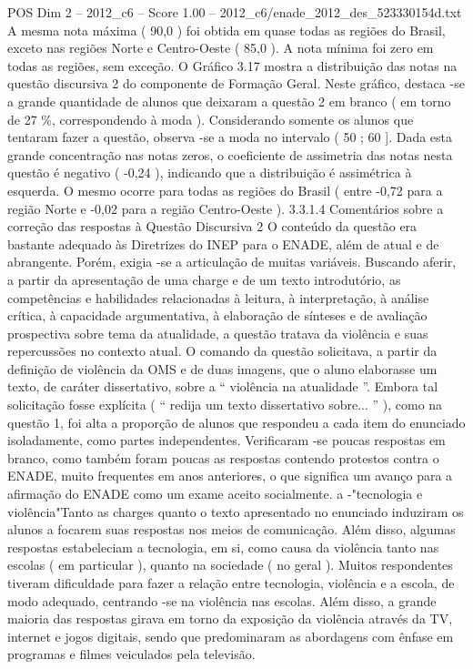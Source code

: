 \begin{textsample}{POS Dim 2 – 2012\_c6 – Score 1.00 – 2012\_c6/enade\_2012\_des\_523330154d.txt}
A mesma nota máxima ( 90,0 ) foi obtida em quase todas as regiões do Brasil, exceto nas regiões Norte e Centro-Oeste ( 85,0 ).
A nota mínima foi zero em todas as regiões, sem exceção.
O Gráfico 3.17 mostra a distribuição das notas na questão discursiva 2 do componente de Formação Geral.
Neste gráfico, destaca -se a grande quantidade de alunos que deixaram a questão 2 em branco ( em torno de 27 \%, correspondendo à moda ).
Considerando somente os alunos que tentaram fazer a questão, observa -se a moda no intervalo ( 50 ; 60 ].
Dada esta grande concentração nas notas zeros, o coeficiente de assimetria das notas nesta questão é negativo ( -0,24 ), indicando que a distribuição é assimétrica à esquerda.
O mesmo ocorre para todas as regiões do Brasil ( entre -0,72 para a região Norte e -0,02 para a região Centro-Oeste ). 3.3.1.4 Comentários sobre a correção das respostas à Questão Discursiva 2 O conteúdo da questão era bastante adequado às Diretrizes do INEP para o ENADE, além de atual e de abrangente.
Porém, exigia -se a articulação de muitas variáveis.
Buscando aferir, a partir da apresentação de uma charge e de um texto introdutório, as competências e habilidades relacionadas à leitura, à interpretação, à análise crítica, à capacidade argumentativa, à elaboração de sínteses e de avaliação prospectiva sobre tema da atualidade, a questão tratava da violência e suas repercussões no contexto atual.
O comando da questão solicitava, a partir da definição de violência da OMS e de duas imagens, que o aluno elaborasse um texto, de caráter dissertativo, sobre a “ violência na atualidade ”.
Embora tal solicitação fosse explícita ( “ redija um texto dissertativo sobre... ” ), como na questão 1, foi alta a proporção de alunos que respondeu a cada item do enunciado isoladamente, como partes independentes.
Verificaram -se poucas respostas em branco, como também foram poucas as respostas contendo protestos contra o ENADE, muito frequentes em anos anteriores, o que significa um avanço para a afirmação do ENADE como um exame aceito socialmente. a -"tecnologia e violência"Tanto as charges quanto o texto apresentado no enunciado induziram os alunos a focarem suas respostas nos meios de comunicação.
Além disso, algumas respostas estabeleciam a tecnologia, em si, como causa da violência tanto nas escolas ( em particular ), quanto na sociedade ( no geral ).
Muitos respondentes tiveram dificuldade para fazer a relação entre tecnologia, violência e a escola, de modo adequado, centrando -se na violência nas escolas.
Além disso, a grande maioria das respostas girava em torno da exposição da violência através da TV, internet e jogos digitais, sendo que predominaram as abordagens com ênfase em programas e filmes veiculados pela televisão.

\end{textsample}
